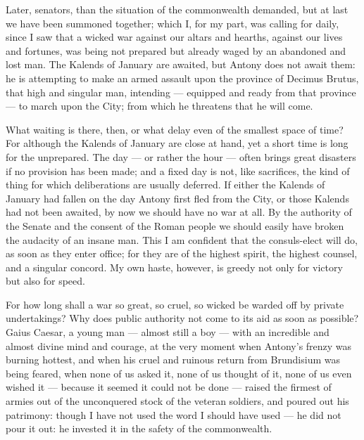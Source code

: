
 Later, senators, than the situation of the commonwealth demanded, but at last we have been summoned together; which I, for my part, was calling for daily, since I saw that a wicked war against our altars and hearths, against our lives and fortunes, was being not prepared but already waged by an abandoned and lost man. The Kalends of January are awaited, but Antony does not await them: he is attempting to make an armed assault upon the province of Decimus Brutus, that high and singular man, intending --- equipped and ready from that province --- to march upon the City; from which he threatens that he will come.

 What waiting is there, then, or what delay even of the smallest space of time? For although the Kalends of January are close at hand, yet a short time is long for the unprepared. The day --- or rather the hour --- often brings great disasters if no provision has been made; and a fixed day is not, like sacrifices, the kind of thing for which deliberations are usually deferred. If either the Kalends of January had fallen on the day Antony first fled from the City, or those Kalends had not been awaited, by now we should have no war at all. By the authority of the Senate and the consent of the Roman people we should easily have broken the audacity of an insane man. This I am confident that the consuls-elect will do, as soon as they enter office; for they are of the highest spirit, the highest counsel, and a singular concord. My own haste, however, is greedy not only for victory but also for speed.

 For how long shall a war so great, so cruel, so wicked be warded off by private undertakings? Why does public authority not come to its aid as soon as possible? Gaius Caesar, a young man --- almost still a boy --- with an incredible and almost divine mind and courage, at the very moment when Antony's frenzy was burning hottest, and when his cruel and ruinous return from Brundisium was being feared, when none of us asked it, none of us thought of it, none of us even wished it --- because it seemed it could not be done --- raised the firmest of armies out of the unconquered stock of the veteran soldiers, and poured out his patrimony: though I have not used the word I should have used --- he did not pour it out: he invested it in the safety of the commonwealth.

